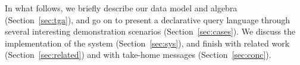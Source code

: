 In what follows, we briefly describe our data model and algebra
(Section~\ref{sec:tga}), and go on to present a declarative query
language through several interesting demonstration scenarios
(Section~\ref{sec:cases}). We discuss the implementation of the \sys
system (Section~\ref{sec:sys}), and finish with related work
(Section~\ref{sec:related}) and with take-home messages
(Section~\ref{sec:conc}).


